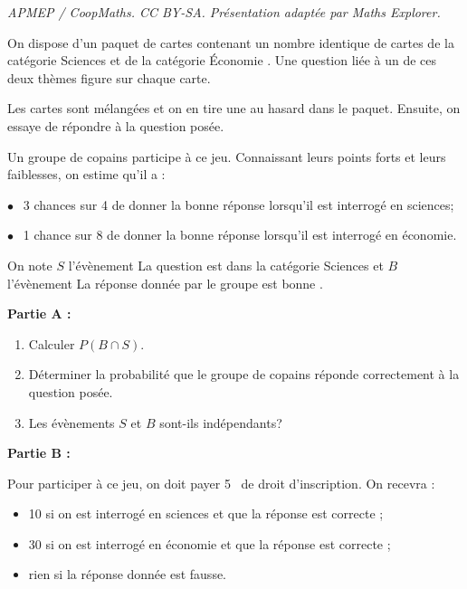\documentclass[10pt]{article}
\providecommand{\euro}{\texteuro}
\providecommand{\euro}{{\text{€}}}
\renewcommand{\euro}{\ifmmode\text{\texteuro}\else\texteuro\fi}
\begin{document}
\noindent\textit{APMEP / CoopMaths. CC BY-SA. Présentation adaptée par Maths Explorer.}\par\medskip
\medskip

On dispose d'un paquet de cartes contenant un nombre identique de cartes de la catégorie \og Sciences\fg{} et de la catégorie \og Économie \fg. Une question liée à un de ces deux thèmes figure sur chaque carte.

Les cartes sont mélangées et on en tire une au hasard dans le paquet. Ensuite, on essaye de répondre à la question posée.

Un groupe de copains participe à ce jeu. Connaissant leurs points forts et leurs faiblesses, on estime qu'il a :

$\bullet~~$ 3 chances sur 4 de donner la bonne réponse lorsqu'il est interrogé en sciences;

$\bullet~~$ 1 chance sur 8 de donner la bonne réponse lorsqu'il est interrogé en économie.

\smallskip

On note $S$ l'évènement \og La question est dans la catégorie Sciences\fg{} et $B$ l'évènement \og La réponse donnée par le groupe est bonne \fg.

\bigskip

\textbf{Partie A :}

\medskip

\begin{enumerate}
\item Calculer $P(B \cap S)$.
\item Déterminer la probabilité que le groupe de copains réponde correctement à la
question posée.
\item Les évènements $S$ et $B$ sont-ils indépendants?
\end{enumerate}

\bigskip

\textbf{Partie B :}

\medskip

Pour participer à ce jeu, on doit payer 5~\euro{} de droit d'inscription. On recevra :

\setlength\parindent{1cm}
\begin{itemize}
\item[$\bullet$~~] 10 \euro{} si on est interrogé en sciences et que la réponse est correcte ;
\item[$\bullet$~~] 30 \euro{} si on est interrogé en économie et que la réponse est correcte ;
\item[$\bullet$~~] rien si la réponse donnée est fausse.
\end{itemize}
\setlength\parindent{0cm}
\end{document}
